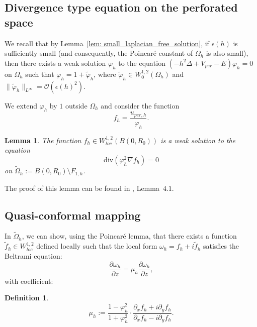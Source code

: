 \documentclass[leqno,11pt,letterpaper, english]{amsart}
\theoremstyle{plain}
\newtheorem{lem}[prop]{Lemma}
\theoremstyle{definition}
\newtheorem{defn}[prop]{Definition}
\numberwithin{equation}{section}
\begin{document}
\subsection{Divergence type equation on the perforated space}
\label{subsect: eqdivsuresptroue}
We recall that by Lemma~\ref{lem: small_laplacian_free_solution}, if $\epsilon(h)$ is sufficiently small (and consequently, the Poincaré constant of $\Omega_h$ is also small), then there exists a weak solution $\varphi_h$ to the equation $(-h^2\Delta + V_{per} - E)\varphi_h = 0$ on $\Omega_h$ such that $\varphi_h = 1 + \tilde{\varphi}_h$, where $\tilde{\varphi}_h \in W_0^{1,2}(\Omega_h)$ and $\|\tilde{\varphi}_h\|_{L^\infty} = \mathcal{O}(\epsilon(h)^2)$.

We extend $\varphi_h$ by $1$ outside $\Omega_h$ and consider the function
\begin{equation}
f_h = \frac{u_{per,h}}{\varphi_h}.
\end{equation}


\begin{lem}
The function $f_h \in W_{loc}^{1,2}(B(0, R_0))$ is a weak solution to the equation
\begin{equation}
\mbox{div}(\varphi_h^2 \nabla f_h) = 0
\end{equation}
on $\tilde{\Omega}_h := B(0, R_0) \setminus F_{1,h}$.
\end{lem}

The proof of this lemma can be found in \cite{logunov2020landisconjectureexponentialdecay}, Lemma~$4.1$.

\subsection{Quasi-conformal mapping}
\label{subsect: chg de var quasi-conforme}
In $\tilde{\Omega}_h$, we can show, using the Poincaré lemma, that there exists a function $\tilde{f}_h \in W_{loc}^{1,2}$ defined locally such that the local form $\omega_h = f_h + i\tilde{f}_h$ satisfies the Beltrami equation:
\begin{equation}
\frac{\partial \omega_h}{\partial \bar{z}} = \mu_h \frac{\partial \omega_h}{\partial z},
\label{eq: Beltrami}
\end{equation}
with coefficient:
\begin{defn}
\label{def: definition du coeff de Beltrami}
\begin{equation}
\mu_h := \frac{1 - \varphi_h^2}{1 + \varphi_h^2} \cdot \frac{\partial_x f_h + i \partial_y f_h}{\partial_x f_h - i \partial_y f_h}.
\end{equation}
\end{defn}
\end{document}
